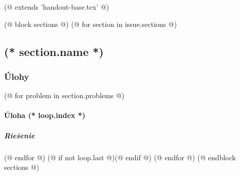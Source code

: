 (@ extends 'handout-base.tex' @)

(@ block sections @)
    (@ for section in issue.sections @)
        \subsection{(* section.name *)}
        \subsubsection{Úlohy}
        (@ for problem in section.problems @)
            \paragraph{Úloha (* loop.index *)}
            \subparagraph{Riešenie}
        (@ endfor @)
        (@ if not loop.last @)\newpage(@ endif @)
    (@ endfor @)
(@ endblock sections @)

